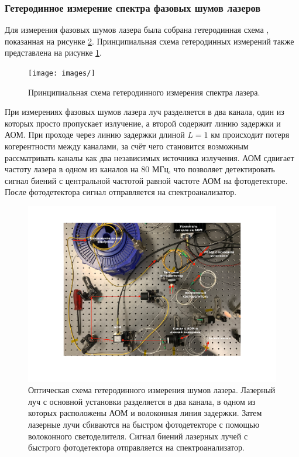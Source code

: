 \subsubsection{Гетеродинное измерение спектра фазовых шумов лазеров}

Для измерения фазовых шумов лазера была собрана гетеродинная схема \cite{Saffman_Noise}, показанная на рисунке \ref{fig:heterodyne_measurement}.  Принципиальная схема гетеродинных измерений также представлена на рисунке \ref{fig:heterodyne_principal}.

\begin{figure}[ht]
	\centering
	\texttt{[image: images/]}
	\caption{Принципиальная схема гетеродинного измерения спектра лазера.}
	\label{fig:heterodyne_principal}
\end{figure}

При измерениях фазовых шумов лазера луч разделяется в два канала, один из которых просто пропускает излучение, а второй содержит линию задержки и АОМ. При проходе через линию задержки длиной $L = 1 \text{ км}$ происходит потеря когерентности между каналами, за счёт чего становится возможным рассматривать каналы как два независимых источника излучения. АОМ сдвигает частоту лазера в одном из каналов на $80 \text{ МГц}$, что позволяет детектировать сигнал биений с центральной частотой равной частоте АОМ на фотодетекторе. После фотодетектора сигнал отправляется на спектроанализатор. 

\begin{figure}[ht]
	\centering
	\includegraphics[width=1.0\textwidth]{images/heterodyne_measurement.pdf}
	\caption{Оптическая схема гетеродинного измерения шумов лазера. Лазерный луч с основной установки разделяется в два канала, в одном из которых расположены АОМ и волоконная линия задержки. Затем лазерные лучи сбиваются на быстром фотодетекторе с помощью волоконного светоделителя. Сигнал биений лазерных лучей с быстрого фотодетектора отправляется на спектроанализатор.}
	\label{fig:heterodyne_measurement}
\end{figure}

